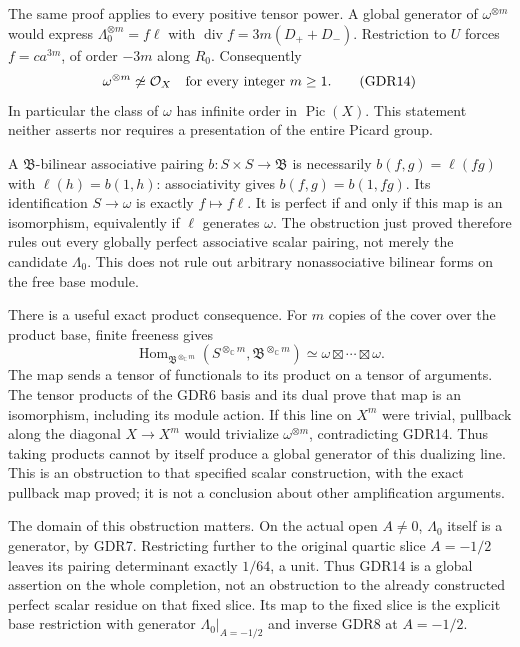 \documentclass[11pt]{article}
\newcommand{\C}{\mathbb C}
\providecommand{\Div}{\operatorname{div}}
\providecommand{\Hom}{\operatorname{Hom}}
\begin{document}
The same proof applies to every positive tensor power. A global
generator of $\omega^{\otimes m}$ would express
$\Lambda_0^{\otimes m}=f\ell$ with
$\Div f=3m(D_++D_-)$. Restriction to $U$ forces
$f=c a^{3m}$, of order $-3m$ along $R_0$. Consequently
\begin{equation}
 \omega^{\otimes m}\not\simeq\mathcal O_X
 \quad\hbox{for every integer }m\ge1.
 \tag{GDR14}
\end{equation}
In particular the class of $\omega$ has infinite order in
$\operatorname{Pic}(X)$. This statement neither asserts nor
requires a presentation of the entire Picard group.

A $\mathfrak B$-bilinear associative pairing $b:S\times S\to
\mathfrak B$ is necessarily $b(f,g)=\ell(fg)$ with
$\ell(h)=b(1,h)$: associativity gives
$b(f,g)=b(1,fg)$. Its identification $S\to\omega$ is
exactly $f\mapsto f\ell$. It is perfect if and only if this
map is an isomorphism, equivalently if $\ell$ generates
$\omega$. The obstruction just proved therefore rules out
every globally perfect associative scalar pairing, not merely
the candidate $\Lambda_0$. This does not rule out arbitrary
nonassociative bilinear forms on the free base module.

There is a useful exact product consequence. For $m$ copies of
the cover over the product base, finite freeness gives
\[
 \Hom_{\mathfrak B^{\otimes_\C m}}
 (S^{\otimes_\C m},\mathfrak B^{\otimes_\C m})
 \simeq \omega\boxtimes\cdots\boxtimes\omega.
\]
The map sends a tensor of functionals to its product on a tensor
of arguments. The tensor products of the GDR6 basis and its
dual prove that map is an isomorphism, including its module
action. If this line on $X^m$ were trivial, pullback along the
diagonal $X\to X^m$ would trivialize $\omega^{\otimes m}$,
contradicting GDR14. Thus taking products cannot by itself
produce a global generator of this dualizing line. This is
an obstruction to that specified scalar construction, with
the exact pullback map proved; it is not a conclusion about
other amplification arguments.

The domain of this obstruction matters. On the actual open
$A\ne0$, $\Lambda_0$ itself is a generator, by GDR7.
Restricting further to the original quartic slice $A=-1/2$
leaves its pairing determinant exactly $1/64$, a unit.
Thus GDR14 is a global assertion on the whole completion,
not an obstruction to the already constructed perfect
scalar residue on that fixed slice. Its map to the fixed
slice is the explicit base restriction with generator
$\Lambda_0|_{A=-1/2}$ and inverse GDR8 at $A=-1/2$.
\end{document}
